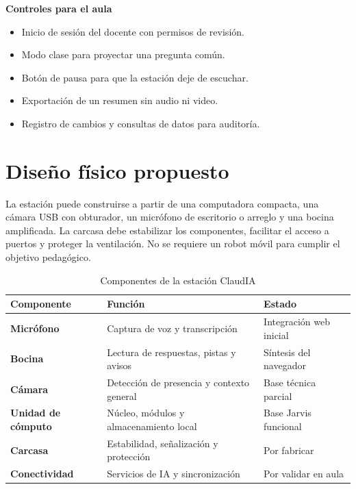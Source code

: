 \documentclass[letterpaper,11pt]{article}
\newcommand{\shortsection}[1]{\par\noindent\textbf{\fontsize{11}{19}\selectfont #1}\par}
\begin{document}
\shortsection{Controles para el aula}
\begin{itemize}
  \item Inicio de sesión del docente con permisos de revisión.
  \item Modo clase para proyectar una pregunta común.
  \item Botón de pausa para que la estación deje de escuchar.
  \item Exportación de un resumen sin audio ni video.
  \item Registro de cambios y consultas de datos para auditoría.
\end{itemize}

\clearpage

\section{Diseño físico propuesto}

La estación puede construirse a partir de una computadora compacta, una cámara USB con obturador, un micrófono de escritorio o arreglo y una bocina amplificada. La carcasa debe estabilizar los componentes, facilitar el acceso a puertos y proteger la ventilación. No se requiere un robot móvil para cumplir el objetivo pedagógico.

\begin{table}[H]
\centering
\caption{Componentes de la estación ClaudIA}
\begin{tabularx}{\textwidth}{@{}>{\bfseries}p{1.35in}X>{\raggedright\arraybackslash}p{1.2in}@{}}
\toprule
Componente & Función & Estado \\
\midrule
Micrófono & Captura de voz y transcripción & Integración web inicial \\
Bocina & Lectura de respuestas, pistas y avisos & Síntesis del navegador \\
Cámara & Detección de presencia y contexto general & Base técnica parcial \\
Unidad de cómputo & Núcleo, módulos y almacenamiento local & Base Jarvis funcional \\
Carcasa & Estabilidad, señalización y protección & Por fabricar \\
Conectividad & Servicios de IA y sincronización & Por validar en aula \\
\bottomrule
\end{tabularx}
\end{table}
\end{document}
